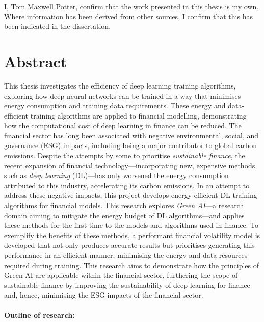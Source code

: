 \documentclass[a4paper, 11pt]{report}
\begin{document}
    I, Tom Maxwell Potter, confirm that the work presented in this thesis is my own. Where information has been derived from other sources, I confirm that this has been indicated in the dissertation.


    \newpage

    \chapter*{Abstract}

    This thesis investigates the efficiency of deep learning training algorithms, exploring how deep neural networks can be trained in a way that minimises energy consumption and training data requirements. These energy and data-efficient training algorithms are applied to financial modelling, demonstrating how the computational cost of deep learning in finance can be reduced. The financial sector has long been associated with negative environmental, social, and governance (ESG) impacts, including being a major contributor to global carbon emissions. Despite the attempts by some to prioritise \emph{sustainable finance}, the recent expansion of financial technology---incorporating new, expensive methods such as \emph{deep learning} (DL)---has only worsened the energy consumption attributed to this industry, accelerating its carbon emissions. In an attempt to address these negative impacts, this project develops energy-efficient DL training algorithms for financial models. This research explores \emph{Green AI}---a research domain aiming to mitigate the energy budget of DL algorithms---and applies these methods for the first time to the models and algorithms used in finance. To exemplify the benefits of these methods, a performant financial volatility model is developed that not only produces accurate results but prioritises generating this performance in an efficient manner, minimising the energy and data resources required during training. This research aims to demonstrate how the principles of Green AI are applicable within the financial sector, furthering the scope of sustainable finance by improving the sustainability of deep learning for finance and, hence, minimising the ESG impacts of the financial sector.
    \\
    \textbf{\\Outline of research:} 
\end{document}

